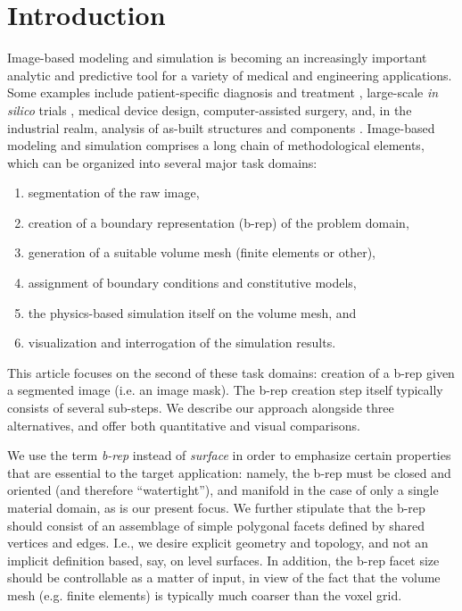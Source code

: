 \section{Introduction}

Image-based modeling and simulation is becoming an increasingly important analytic and predictive tool for a variety of medical and engineering applications. Some examples include patient-specific diagnosis and treatment \cite{neal2010current}, large-scale \textit{in silico} trials \cite{viceconti2016silico}, medical device design, computer-assisted surgery, and, in the industrial realm, analysis of as-built structures and components \cite{bradley2005advances}. Image-based modeling and simulation comprises a long chain of methodological elements, which can be organized into several major task domains: 
\begin{enumerate}
\item
segmentation of the raw image, 
\item
creation of a boundary representation (b-rep) of the problem domain,
\item
generation of a suitable volume mesh (finite elements or other), 
\item
assignment
of boundary conditions and constitutive models, 
\item
the physics-based
simulation itself on the volume mesh, and
\item
visualization and interrogation of the simulation results.
\end{enumerate}

This article focuses on the second of these task domains:  creation of a b-rep given a segmented image (i.e. an image mask).  
The b-rep creation step itself typically consists of several sub-steps.  
We describe our approach alongside three alternatives, and offer both quantitative and visual comparisons.  

We use the term {\em b-rep} instead of {\em surface}
in order to emphasize certain properties that are essential to the target
application:  namely, the b-rep must be closed and oriented (and therefore
``watertight''), and manifold in the case of only a single material domain, as is our present focus.  We further stipulate that the b-rep should consist of an assemblage of simple polygonal facets defined by shared vertices and 
edges.  I.e., we desire explicit geometry and topology, and not an implicit definition based, say, on level surfaces. In addition, the b-rep facet size should be controllable as a matter of input, in view of the fact that the volume mesh (e.g. finite elements) is typically much coarser than the voxel grid.

